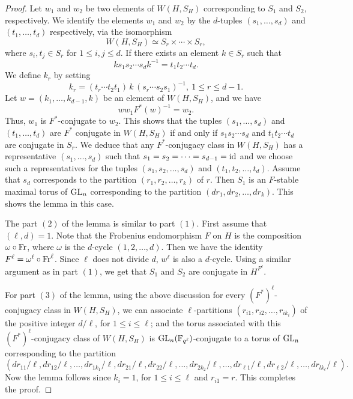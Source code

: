 \documentclass[10pt, reqno]{amsart}
\theoremstyle{plain}
\numberwithin{equation}{section} \newcommand{\di}{\operatorname{dim}}
\begin{document}
\begin{proof}
Let $w_1$ and $w_2$ be two elements of $W(H, S_H)$ corresponding to $S_1$ and $S_2$,
respectively. We
identify the elements $w_1$ and $w_2$ by the $d$-tuples
$(s_1,\dots,s_d)$ and $(t_1,\dots,t_d)$ respectively, via the
isomorphism
$$ W(H,S_H)\simeq S_{r}\times\cdots\times S_{r},$$
where $s_i, t_j \in S_{r}$ for $1\leq i,j\leq d$. If there exists an element
$k\in S_{r}$  such that
$$ks_1s_2\cdots s_dk^{-1}=t_1t_2\cdots t_d.$$
We define $k_r$ by setting
$$ k_r = (t_r\cdots t_2t_1)\, k\,(s_r\cdots s_2s_1)^{-1},\ 1\leq r\leq d-1. $$
Let $w=(k_1,\dots,k_{d-1},k)$ be an element of $W(H,S_H)$, and we have
$$ww_1F^*(w)^{-1} = w_2.$$ Thus, $w_1$ is $F^*$-conjugate to $w_2$.
This shows that the tuples $(s_1,\dots,s_d)$ and $(t_1,\dots,t_d)$ are
$F^\ast$ conjugate in $W(H, S_H)$ if and only if $s_1s_2\cdots s_d$ and
$t_1t_2\cdots t_d$ are conjugate in $S_r$. We deduce that any
$F^\ast$-conjugacy class in $W(H, S_H)$ has a representative
$(s_1,\dots, s_d)$ such that $s_1=s_2=\cdots=s_{d-1}={\rm id}$ and we
choose such a representatives for the tuples $(s_1, s_2,\dots, s_d)$ and
$(t_1,t_2,\dots, t_d)$. Assume that $s_d$ corresponds to the partition
$(r_1,r_2,\dots, r_k)$ of $r$. Then $S_1$ is an
$F$-stable maximal torus of ${\rm GL}_n$ corresponding to the partition
$(dr_1,dr_2,\dots, dr_k)$. This shows the lemma in this case.
	
The part $(2)$ of the lemma is similar to part $(1)$. First assume that
$(\ell, d)=1$. Note that the Frobenius endomorphism $F$ on $H$ is the
composition $\omega\circ {\rm Fr}$, where $\omega$ is the $d$-cycle
$(1,2,\dots,d)$. Then we have the identity
$F^{\ell} = \omega^\ell\circ {\rm Fr}^\ell$. Since $\ell$ does not
divide $d$, $w^\ell$ is also a $d$-cycle. Using a similar argument as
in part $(1)$, we get that $S_1$ and $S_2$ are conjugate in
$H^{F^{\ell}}$.

For part $(3)$ of the lemma, using the above discussion for every
$(F^\ast)^\ell$-conjugacy class in $W(H, S_H)$, we can associate
$\ell$-partitions $(r_{i1}, r_{i2},\dots, r_{ik_i})$ of the positive integer 
$d/\ell$, for $1\leq i\leq \ell$; and the torus associated with this 
$(F^\ast)^\ell$-conjugacy class of
$W(H, S_H)$ is ${\rm GL}_n(\mathbb{F}_{q^\ell})$-conjugate to a torus
of ${\rm GL}_n$ corresponding to the partition
$$(dr_{11}/\ell, dr_{12}/\ell,\dots, dr_{1k_1}/\ell, dr_{21}/\ell,
dr_{22}/\ell,\dots, dr_{2k_2}/\ell, \dots, dr_{\ell1}/\ell,
dr_{\ell2}/\ell,\dots, dr_{lk_\ell}/\ell).$$ Now the lemma follows
since $k_i=1$, for $1\leq i\leq \ell$ and $r_{i1}=r$.  This completes
the proof.
\end{proof}
\end{document}
